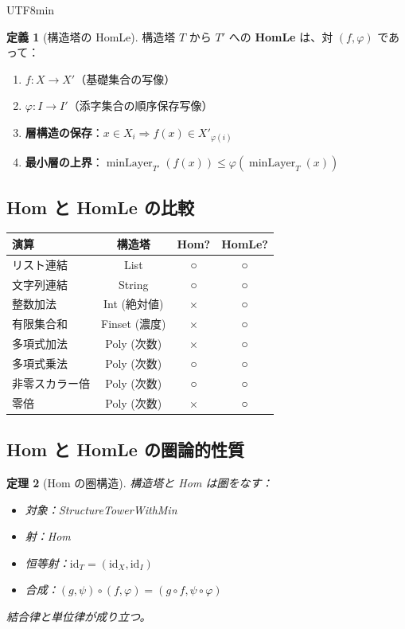 \documentclass[12pt,a4paper]{article}
\newtheorem{theorem}{定理}[section]
\theoremstyle{definition}
\newtheorem{definition}[theorem]{定義}
\theoremstyle{remark}
\DeclareMathOperator{\minLayer}{minLayer}
\begin{document}
\begin{CJK}{UTF8}{min}
\begin{definition}[構造塔の HomLe]
構造塔 $T$ から $T'$ への \textbf{HomLe} は、対 $(f, \varphi)$ であって：
\begin{enumerate}
\item $f: X \to X'$（基礎集合の写像）
\item $\varphi: I \to I'$（添字集合の順序保存写像）
\item \textbf{層構造の保存}：$x \in X_i \Rightarrow f(x) \in X'_{\varphi(i)}$
\item \textbf{最小層の上界}：$\minLayer_{T'}(f(x)) \leq \varphi(\minLayer_T(x))$
\end{enumerate}
\end{definition}

\subsection{Hom と HomLe の比較}

\begin{center}
\begin{tabular}{|l|c|c|c|}
\hline
\textbf{演算} & \textbf{構造塔} & \textbf{Hom?} & \textbf{HomLe?} \\
\hline
リスト連結 & List & ○ & ○ \\
文字列連結 & String & ○ & ○ \\
整数加法 & Int (絶対値) & × & ○ \\
有限集合和 & Finset (濃度) & × & ○ \\
多項式加法 & Poly (次数) & × & ○ \\
多項式乗法 & Poly (次数) & ○ & ○ \\
非零スカラー倍 & Poly (次数) & ○ & ○ \\
零倍 & Poly (次数) & × & ○ \\
\hline
\end{tabular}
\end{center}

\subsection{Hom と HomLe の圏論的性質}

\begin{theorem}[Hom の圏構造]
構造塔と Hom は圏をなす：
\begin{itemize}
\item 対象：StructureTowerWithMin
\item 射：Hom
\item 恒等射：$\text{id}_T = (\text{id}_X, \text{id}_I)$
\item 合成：$(g, \psi) \circ (f, \varphi) = (g \circ f, \psi \circ \varphi)$
\end{itemize}
結合律と単位律が成り立つ。
\end{theorem}


\end{CJK}
\end{document}

